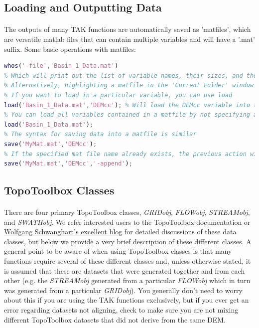 \subsection{Loading and Outputting Data} \label{sec:loadPrimer}
\paragraph{}The outputs of many TAK functions are automatically saved as 'matfiles', which are versatile matlab files that can contain multiple variables and will have a '.mat' suffix. Some basic operations with matfiles:

\begin{lstlisting}[language=Matlab]
% You can querry the contents of a matfile
whos('-file','Basin_1_Data.mat')
% Which will print out the list of variable names, their sizes, and the type of data stored in that variable to the workspace
% Alternatively, highlighting a matfile in the 'Current Folder' window will display the contents in the bottom left of the Matlab screen
% If you want to load in a particular variable, you can use load
load('Basin_1_Data.mat','DEMcc'); % Will load the DEMcc variable into the workspace
% You can load all variables contained in a matfile by not specifying any variables with the load command
load('Basin_1_Data.mat');
% The syntax for saving data into a matfile is similar
save('MyMat.mat','DEMcc');
% If the specified mat file name already exists, the previous action will overwrite the matfile. If you instead want to add the variable to the variables already stored in the matfile, you can use '-append'
save('MyMat.mat','DEMcc','-append');
\end{lstlisting}


\subsection{TopoToolbox Classes} \label{sec:ttPrimer}
\paragraph{}There are four primary TopoToolbox classes, \textit{GRIDobj}, \textit{FLOWobj}, \textit{STREAMobj}, and \textit{SWATHobj}. We refer interested users to the TopoToolbox documentation or \href{https://topotoolbox.wordpress.com/}{Wolfgang Schwanghart's excellent blog} for detailed discussions of these data classes, but below we provide a very brief description of these different classes. A general point to be aware of when using TopoToolbox classes is that many functions require several of these different classes and, unless otherwise stated, it is assumed that these are datasets that were generated together and from each other (e.g. the \textit{STREAMobj} generated from a particular \textit{FLOWobj} which in turn was generated from a particular \textit{GRIDobj}). You generally don't need to worry about this if you are using the TAK functions exclusively, but if you ever get an error regarding datasets not aligning, check to make sure you are not mixing different TopoToolbox datasets that did not derive from the same DEM. 

